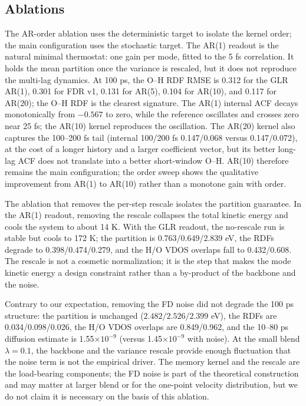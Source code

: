 \subsection{Ablations}

The AR-order ablation uses the deterministic target to isolate the kernel order; the main
configuration uses the stochastic target. The AR(1) readout is the natural minimal thermostat:
one gain per mode, fitted to the 5 fs correlation. It holds the mean partition once the variance is rescaled, but it does not reproduce
the multi-lag dynamics. At 100 ps, the O--H RDF RMSE is 0.312 for the GLR AR(1), 0.301 for FDR v1,
0.131 for AR(5), 0.104 for AR(10), and 0.117 for AR(20); the O--H RDF is the clearest signature.
The AR(1) internal ACF decays monotonically from \(-0.567\) to zero, while the reference oscillates
and crosses zero near 25 fs; the AR(10) kernel reproduces the oscillation. The AR(20) kernel also
captures the 100--200 fs tail (internal 100/200 fs 0.147/0.068 versus 0.147/0.072), at the cost of
a longer history and a larger coefficient vector, but its better long-lag ACF does not translate
into a better short-window O--H. AR(10) therefore remains the main configuration; the order sweep
shows the qualitative improvement from AR(1) to AR(10) rather than a monotone gain with order.

The ablation that removes the per-step rescale isolates the partition guarantee. In the AR(1)
readout, removing the rescale collapses the total kinetic energy and cools the system to about
14 K. With the GLR readout, the no-rescale run is stable but cools to 172 K; the partition is
0.763/0.649/2.839 eV, the RDFs degrade to 0.398/0.474/0.279, and the H/O VDOS overlaps fall to
0.432/0.608. The rescale is not a cosmetic normalization; it is the step that makes the mode
kinetic energy a design constraint rather than a by-product of the backbone and the noise.

Contrary to our expectation, removing the FD noise did not degrade the 100 ps structure:
the partition is unchanged (\(2.482/2.526/2.399\) eV), the RDFs are 0.034/0.098/0.026, the
H/O VDOS overlaps are 0.849/0.962, and the 10--80 ps diffusion estimate is 1.55\(\times10^{-9}\)
(versus 1.45\(\times10^{-9}\) with noise). At the small blend \(\lambda=0.1\), the backbone and
the variance rescale provide enough fluctuation that the noise term is not the empirical driver.
The memory kernel and the rescale are the load-bearing components; the FD noise is part of the
theoretical construction and may matter at larger blend or for the one-point velocity
distribution, but we do not claim it is necessary on the basis of this ablation.

